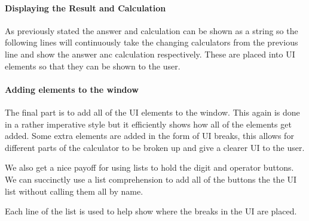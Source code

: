 \documentclass[a4paper]{article}
\begin{document}
\paragraph{Displaying the Result and Calculation}
As previously stated the answer and calculation can be shown as a string so the following lines will continuously take the changing calculators from the previous line and show the answer anc calculation respectively.
These are placed into UI elements so that they can be shown to the user.


\paragraph{Adding elements to the window}
The final part is to add all of the UI elements to the window.
This again is done in a rather imperative style but it efficiently shows how all of the elements get added.
Some extra elements are added in the form of UI breaks, this allows for different parts of the calculator to be broken up and give a clearer UI to the user.
\par
We also get a nice payoff for using lists to hold the digit and operator buttons.
We can succinctly use a list comprehension to add all of the buttons the the UI list without calling them all by name.
\par
Each line of the list is used to help show where the breaks in the UI are placed.

\end{document}
